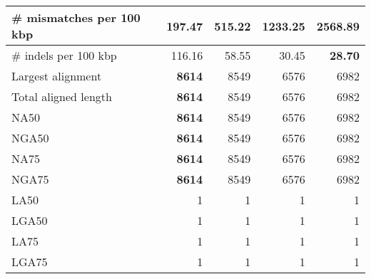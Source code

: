 \documentclass[12pt,a4paper]{article}
\begin{document}
\begin{table}[ht]
\begin{center}
\begin{tabular}{|l*{4}{|r}|}
\# mismatches per 100 kbp & {\bf 197.47} & 515.22 & 1233.25 & 2568.89 \\ \hline
\# indels per 100 kbp & 116.16 & 58.55 & 30.45 & {\bf 28.70} \\ \hline
Largest alignment & {\bf 8614} & 8549 & 6576 & 6982 \\ \hline
Total aligned length & {\bf 8614} & 8549 & 6576 & 6982 \\ \hline
NA50 & {\bf 8614} & 8549 & 6576 & 6982 \\ \hline
NGA50 & {\bf 8614} & 8549 & 6576 & 6982 \\ \hline
NA75 & {\bf 8614} & 8549 & 6576 & 6982 \\ \hline
NGA75 & {\bf 8614} & 8549 & 6576 & 6982 \\ \hline
LA50 & 1 & 1 & 1 & 1 \\ \hline
LGA50 & 1 & 1 & 1 & 1 \\ \hline
LA75 & 1 & 1 & 1 & 1 \\ \hline
LGA75 & 1 & 1 & 1 & 1 \\ \hline
\end{tabular}
\end{center}
\end{table}
\end{document}

